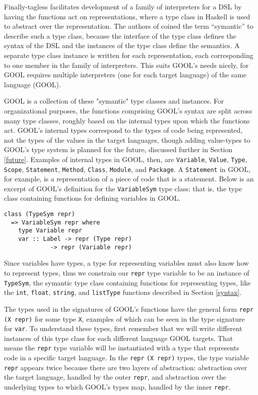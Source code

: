 \documentclass[sigplan,review,anonymous]{acmart}
\begin{document}
Finally-tagless facilitates development of a family of interpreters for a DSL 
by having the functions act on representations, where a type class in Haskell 
is used to abstract over the representation. The authors of 
\cite{carette2009finally} coined the term ``symantic'' to describe such a type 
class, because the interface of the type class defines the syntax of the DSL 
and the instances of the type class define the semantics. A separate type class 
instance is written for each representation, each corresponding to one member 
in the family of interpreters. This suits GOOL's needs nicely, for GOOL 
requires multiple interpreters (one for each target language) of the same 
language (GOOL).

GOOL is a collection of these "symantic" type classes and instances. For 
organizational purposes, the functions comprising GOOL's syntax are split 
across many type classes, roughly based on the internal types upon which the 
functions act. GOOL's internal types correspond to the types of code being 
represented, not the types of the values in the target languages, though adding 
value-types to GOOL's type system is planned for the future, discussed further 
in Section \ref{future}. Examples of internal types in GOOL, then, are 
\verb|Variable|, \verb|Value|, \verb|Type|, \verb|Scope|, \verb|Statement|, 
\verb|Method|, \verb|Class|, \verb|Module|, and \verb|Package|. A 
\verb|Statement| in GOOL, for example, is a representation of a piece of code 
that is a statement. Below is an excerpt of GOOL's definition for the 
\verb|VariableSym| type class; that is, the type class containing functions for 
defining variables in GOOL.
\begin{lstlisting}
class (TypeSym repr) 
  => VariableSym repr where
    type Variable repr
    var :: Label -> repr (Type repr) 
             -> repr (Variable repr)
\end{lstlisting}
Since variables have types, a type for representing variables must also know 
how to represent types, thus we constrain our \verb|repr| type variable to be 
an instance of \verb|TypeSym|, the symantic type class containing functions for 
representing types, like the \verb|int|, \verb|float|, \verb|string|, and 
\verb|listType| functions described in Section \ref{syntax}. 

The types used in the signatures of GOOL's functions have the general form 
\verb|repr| \verb|(X repr)| for some type \verb|X|, examples of which can be 
seen in the type signature for \verb|var|. To understand these types, first 
remember that we will write different instances of this type class for each 
different language GOOL targets. That means the \verb|repr| type variable will 
be instantiated with a type that represents code in a specific target language. 
In the \verb|repr| \verb|(X repr)| types, the type variable \verb|repr| appears 
twice because there are two layers of abstraction: abstraction over the target 
language, handled by the outer \verb|repr|, and abstraction over the underlying 
types to which GOOL's types map, handled by the inner \verb|repr|.
\end{document}
